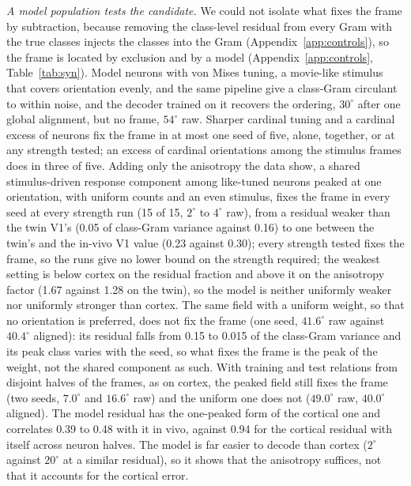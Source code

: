 \documentclass[11pt]{article}
\begin{document}
\emph{A model population tests the candidate.} We could not isolate what fixes the frame by subtraction, because removing the class-level residual from every Gram with the true classes injects the classes into the Gram (Appendix~\ref{app:controls}), so the frame is located by exclusion and by a model (Appendix~\ref{app:controls}, Table~\ref{tab:syn}). Model neurons with von Mises tuning, a movie-like stimulus that covers orientation evenly, and the same pipeline give a class-Gram circulant to within noise, and the decoder trained on it recovers the ordering, $30^\circ$ after one global alignment, but no frame, $54^\circ$ raw. Sharper cardinal tuning and a cardinal excess of neurons fix the frame in at most one seed of five, alone, together, or at any strength tested; an excess of cardinal orientations among the stimulus frames does in three of five. Adding only the anisotropy the data show, a shared stimulus-driven response component among like-tuned neurons peaked at one orientation, with uniform counts and an even stimulus, fixes the frame in every seed at every strength run (15 of 15, $2^\circ$ to $4^\circ$ raw), from a residual weaker than the twin V1's (0.05 of class-Gram variance against 0.16) to one between the twin's and the in-vivo V1 value (0.23 against 0.30); every strength tested fixes the frame, so the runs give no lower bound on the strength required; the weakest setting is below cortex on the residual fraction and above it on the anisotropy factor (1.67 against 1.28 on the twin), so the model is neither uniformly weaker nor uniformly stronger than cortex. The same field with a uniform weight, so that no orientation is preferred, does not fix the frame (one seed, $41.6^\circ$ raw against $40.4^\circ$ aligned): its residual falls from 0.15 to 0.015 of the class-Gram variance and its peak class varies with the seed, so what fixes the frame is the peak of the weight, not the shared component as such. With training and test relations from disjoint halves of the frames, as on cortex, the peaked field still fixes the frame (two seeds, $7.0^\circ$ and $16.6^\circ$ raw) and the uniform one does not ($49.0^\circ$ raw, $40.0^\circ$ aligned). The model residual has the one-peaked form of the cortical one and correlates 0.39 to 0.48 with it in vivo, against 0.94 for the cortical residual with itself across neuron halves. The model is far easier to decode than cortex ($2^\circ$ against $20^\circ$ at a similar residual), so it shows that the anisotropy suffices, not that it accounts for the cortical error.
\end{document}
